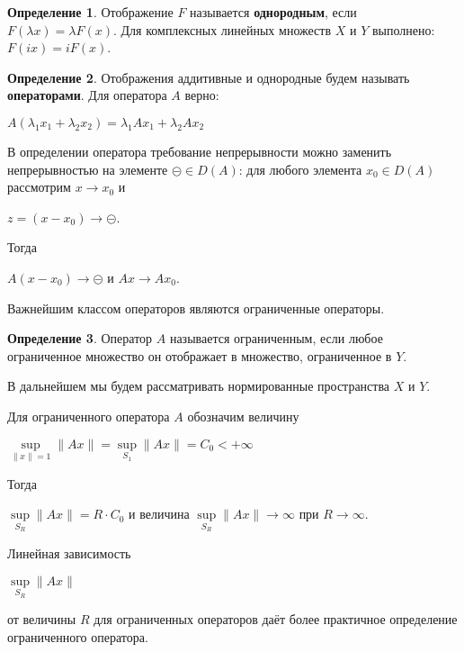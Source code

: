 \documentclass[12pt,a4paper,titlepage,oneside]{book}
\theoremstyle{definition}
\newtheorem*{definition}{Определение}
\theoremstyle{plain}
\theoremstyle{remark}
\theoremstyle{remark}
\theoremstyle{remark}
\theoremstyle{remark}
\theoremstyle{plain}
\theoremstyle{plain}
\begin{document}
\begin{definition} Отображение $F$ называется \textbf{однородным}, если $F(\lambda x)=\lambda F(x)$. Для комплексных линейных множеств $X$ и $Y$ выполнено: $F(ix)=iF(x)$.
\end{definition}

\begin{definition} Отображения аддитивные и однородные будем называть \textbf{операторами}. Для оператора $A$ верно:

\begin{center}
	$A(\lambda_1x_1+\lambda_2x_2)=\lambda_1Ax_1+\lambda_2Ax_2$
\end{center}

\end{definition}

В определении оператора требование непрерывности можно заменить непрерывностью на элементе $\circleddash \in D(A)$: для любого элемента $x_0\in D(A)$ рассмотрим $x \to x_0$ и 
\begin{center}
$z=(x-x_0)\to \circleddash$.
\end{center}
Тогда 
\begin{center}
$A(x-x_0)\to \circleddash$ и $Ax \to Ax_0$.
\end{center}
 
Важнейшим классом операторов являются ограниченные операторы.

\begin{definition} Оператор $A$ называется ограниченным, если любое ограниченное множество он отображает в множество, ограниченное в $Y$.
\end{definition}

В дальнейшем мы будем рассматривать нормированные пространства $X$ и $Y$.

Для ограниченного оператора $A$  обозначим величину 
\begin{center}
$\underset{\parallel x\parallel=1}{\sup}\parallel Ax \parallel =\underset{S_1}{\sup}\parallel Ax \parallel =C_0<+\infty$
\end{center}

Тогда
\begin{center}
$\underset{S_R}{\sup}\parallel Ax \parallel=R\cdot C_0$ 
и величина 
$\underset{S_R}{\sup}\parallel Ax \parallel\to\infty $ 
при $R\to\infty$.
\end{center}
Линейная зависимость
\begin{center}
$\underset{S_R}{\sup}\parallel Ax \parallel$ 
\end{center}
от величины $R$ для ограниченных операторов даёт более практичное определение ограниченного оператора.
\end{document}
